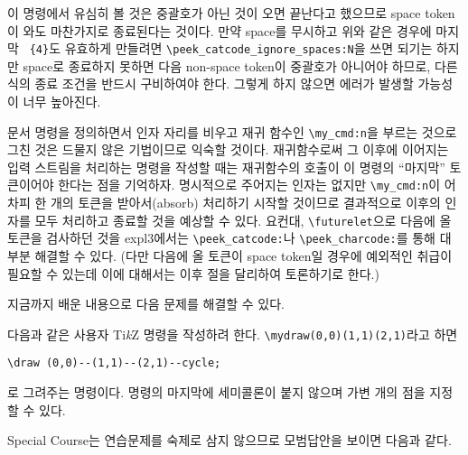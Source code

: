 \documentclass[a4paper,amsmath]{oblivoir}
\newcommand\tikzlogo{Ti\textit{k}Z}
\begin{document}
이 명령에서 유심히 볼 것은 중괄호가 아닌 것이 오면 끝난다고 했으므로 space token이 와도 마찬가지로 종료된다는 것이다. 만약 space를 무시하고 위와 같은 경우에 마지막 \verb| {4}|도 유효하게 만들려면 \verb|\peek_catcode_ignore_spaces:N|을 쓰면 되기는 하지만 space로 종료하지 못하면 다음 non-space token이 중괄호가 아니어야 하므로, 다른 식의 종료 조건을 반드시 구비하여야 한다. 그렇게 하지 않으면 에러가 발생할 가능성이 너무 높아진다.

문서 명령을 정의하면서 인자 자리를 비우고 재귀 함수인 \verb|\my_cmd:n|을 부르는 것으로
그친 것은 드물지 않은 기법이므로 익숙할 것이다. 재귀함수로써 그 이후에 이어지는 입력 스트림을
처리하는 명령을 작성할 때는 재귀함수의 호출이 이 명령의 “마지막” 토큰이어야 한다는 점을 기억하자.
명시적으로 주어지는 인자는 없지만 \verb|\my_cmd:n|이
어차피 한 개의 토큰을 받아서(absorb) 처리하기 시작할 것이므로 결과적으로 이후의 인자를 모두 처리하고 종료할 것을 예상할 수 있다.
요컨대,
\verb|\futurelet|으로 다음에 올 토큰을 검사하던 것을 expl3에서는
\verb|\peek_catcode:|나 \verb|\peek_charcode:|\allowbreak 를 통해 대부분 해결할 수 있다.
(다만 다음에 올 토큰이 space token일 경우에 예외적인 취급이 필요할 수 있는데 이에 대해서는
이후 절을 달리하여 토론하기로 한다.)

\bigskip

지금까지 배운 내용으로 다음 문제를 해결할 수 있다.

\begin{questionp}
다음과 같은 사용자 \tikzlogo{} 명령을 작성하려 한다.
\verb|\mydraw(0,0)(1,1)(2,1)|라고 하면
\begin{verbatim}
\draw (0,0)--(1,1)--(2,1)--cycle;
\end{verbatim}
로 그려주는 명령이다. 명령의 마지막에 세미콜론이 붙지 않으며 가변 개의 점을 지정할 수 있다.
\end{questionp}

Special Course는 연습문제를 숙제로 삼지 않으므로 모범답안을 보이면 다음과 같다.

\end{document}
